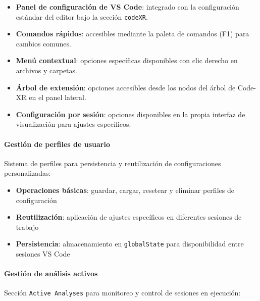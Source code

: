 \documentclass[a4paper, 12pt]{book}
\begin{document}
\begin{itemize}
  \item \textbf{Panel de configuración de VS Code}: integrado con la configuración estándar del editor bajo la sección \texttt{codeXR}.
  
  \item \textbf{Comandos rápidos}: accesibles mediante la paleta de comandos (F1) para cambios comunes.
  
  \item \textbf{Menú contextual}: opciones específicas disponibles con clic derecho en archivos y carpetas.
  
  \item \textbf{Árbol de extensión}: opciones accesibles desde los nodos del árbol de Code-XR en el panel lateral.
  
  \item \textbf{Configuración por sesión}: opciones disponibles en la propia interfaz de visualización para ajustes específicos.
\end{itemize}


\paragraph{Gestión de perfiles de usuario}
Sistema de perfiles para persistencia y reutilización de configuraciones personalizadas:

\begin{itemize}
  \item \textbf{Operaciones básicas}: guardar, cargar, resetear y eliminar perfiles de configuración
  \item \textbf{Reutilización}: aplicación de ajustes específicos en diferentes sesiones de trabajo
  \item \textbf{Persistencia}: almacenamiento en \texttt{globalState} para disponibilidad entre sesiones VS Code
\end{itemize}

\paragraph{Gestión de análisis activos}
Sección \texttt{Active Analyses} para monitoreo y control de sesiones en ejecución:
\end{document}
